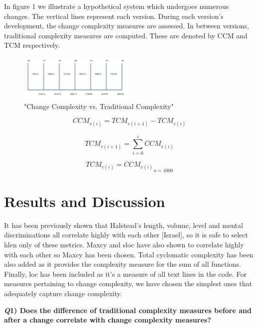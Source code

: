 \documentclass[9pt,twocolumn,a4paper]{article}
\begin{document}
In figure 1 we illustrate a hypothetical system which undergoes numerous changes. The vertical lines represent each version. During each version's development, the change complexity measures are assessed. In between versions, traditional complexity measures are computed. These are denoted by CCM and TCM respectively.

\begin{figure}[h!]
  \centering
  \includegraphics[width=0.5\textwidth]{change_complexity_figure}
   \caption{"Change Complexity vs. Traditional Complexity"}
\end{figure}

\begin{equation}
{{CCM_{v(i)}} = {TCM_{v(i+1)}}-{TCM_{v(i)}}}
\end{equation}

\begin{equation}
{{TCM_{v(i+1)}} = \sum\limits_{i=0}^iCCM_{v(i)}}
\end{equation}
 
\begin{equation}
{{{TCM_{v(i)}} = CCM_{v(i)}}   _{n=1000}}
\end{equation}

\section{Results and Discussion}

It has been previously shown that Halstead’s length, volume, level and mental discriminations all correlate highly with each other [Israel], so it is safe to select hlen only of these metrics. Maxcy and sloc have also shown to correlate highly with each other so Maxcy has been chosen. Total cyclomatic complexity has been also added as it provides the complexity measure for the sum of all functions. Finally, loc has been included as it’s a measure of all text lines in the code. For measures pertaining to change complexity, we have chosen the simplest ones that adequately capture change complexity. 
\newline

{\bf{\emph Q1) Does the difference of traditional complexity measures before and after a change correlate with change complexity measures?}}
\newline
\end{document}

